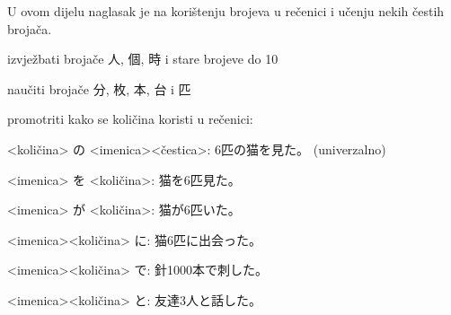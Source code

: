 
\author{Tomislav Mamić}

	
	U ovom dijelu naglasak je na korištenju brojeva u rečenici i učenju nekih čestih brojača.
	
	
	\begin{hyou}
		\item izvježbati brojače 人, 個, 時 i stare brojeve do 10
		\item naučiti brojače 分, 枚, 本, 台 i 匹
		\item promotriti kako se količina koristi u rečenici:
		\begin{hyou}
			\item <količina> の <imenica><čestica>: 6匹の猫を見た。 (univerzalno)
			\item <imenica> を <količina>: 猫を6匹見た。
			\item <imenica> が <količina>: 猫が6匹いた。
			\item <imenica><količina> に: 猫6匹に出会った。
			\item <imenica><količina> で: 針1000本で刺した。
			\item <imenica><količina> と: 友達3人と話した。
		\end{hyou}
	\end{hyou}
